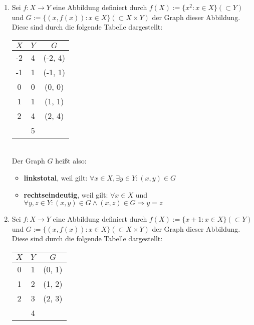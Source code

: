 \documentclass[10pt, oneside]{article}
\begin{document}
\begin{enumerate}
    \item Sei $f: X \rightarrow Y$ eine Abbildung definiert durch $f(X) :=
        \{x^2 : x \in X\} (\subset Y)$ und $G := \{(x, f(x)) : x \in X\}
        (\subset X \times Y)$ der Graph dieser Abbildung. Diese sind durch die
        folgende Tabelle dargestellt:
        \begin{table*}[h]
            \centering
            \begin{tabular}{c|c|c}
                $X$ & $Y$ & $G$ \\
                \hline
                -2 & 4 & (-2, 4) \\
                -1 & 1 & (-1, 1) \\
                0  & 0 & (0,  0) \\
                1  & 1 & (1,  1) \\
                2  & 4 & (2,  4) \\
                   & 5 &
            \end{tabular}
        \end{table*}\\
        Der Graph $G$ hei{\ss}t also:
        \begin{itemize}
            \item \textbf{linkstotal}, weil gilt: $\forall x \in X, \exists y \in Y : (x, y) \in G$
            \item \textbf{rechtseindeutig}, weil gilt: $\forall x \in X$ und $\forall y,z \in Y : (x, y) \in G \land (x, z) \in G \Rightarrow y = z$
        \end{itemize}
    \item Sei $f: X \rightarrow Y$ eine Abbildung definiert durch $f(X) :=
        \{x + 1 : x \in X\} (\subset Y)$ und $G := \{(x, f(x)) : x \in X\}
        (\subset X \times Y)$ der Graph dieser Abbildung. Diese sind durch die
        folgende Tabelle dargestellt:
        \begin{table*}[h]
            \centering
            \begin{tabular}{c|c|c}
                $X$ & $Y$ & $G$ \\
                \hline
                0  & 1 & (0,  1) \\
                1  & 2 & (1,  2) \\
                2  & 3 & (2,  3) \\
                   & 4 &
            \end{tabular}
        \end{table*}


\end{enumerate}
\end{document}
